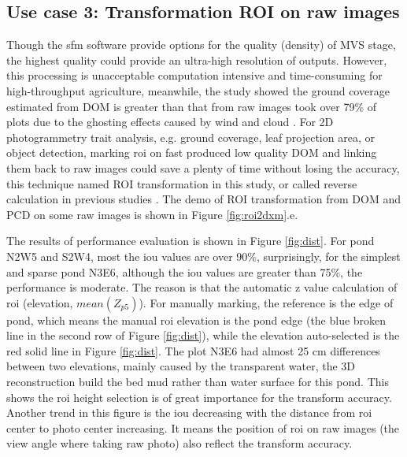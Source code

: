 \documentclass{configs/bmcart}
\begin{document}
\subsection*{Use case 3: Transformation ROI on raw images}
Though the \acrshort*{sfm} software provide options for the quality (density) of MVS stage, the highest quality could provide an ultra-high resolution of outputs. However, this processing is unacceptable computation intensive and time-consuming for high-throughput agriculture, meanwhile, the study showed the ground coverage estimated from DOM is greater than that from raw images took over 79\% of plots due to the ghosting effects caused by wind and cloud \cite{duan_comparison_2017}. For 2D photogrammetry trait analysis, e.g. ground coverage, leaf projection area, or object detection, marking \acrfull*{roi} on fast produced low quality DOM and linking them back to raw images could save a plenty of time without losing the accuracy, this technique named ROI transformation in this study, or called reverse calculation in previous studies \cite{duan_comparison_2017,tresch_easympe_2019}. The demo of ROI transformation from DOM and PCD on some raw images is shown in Figure \ref{fig:roi2dxm}.e.

The results of performance evaluation is shown in Figure \ref{fig:dist}. For pond N2W5 and S2W4, most the \acrshort*{iou} values are over 90\%, surprisingly, for the simplest and sparse pond N3E6, although the \acrshort{iou} values are greater than 75\%, the performance is moderate. The reason is that the automatic z value calculation of \acrshort*{roi} (elevation, $mean(Z_{p5})$). For manually marking, the reference is the edge of pond, which means the manual \acrshort*{roi} elevation is the pond edge (the blue broken line in the second row of Figure \ref{fig:dist}), while the elevation auto-selected is the red solid line in Figure \ref{fig:dist}. The plot N3E6 had almost 25 cm differences between two elevations, mainly caused by the transparent water, the 3D reconstruction build the bed mud rather than water surface for this pond. This shows the \acrshort*{roi} height selection is of great importance for the transform accuracy. Another trend in this figure is the \acrshort*{iou} decreasing with the distance from \acrshort*{roi} center to photo center increasing. It means the position of \acrshort*{roi} on raw images (the view angle where taking raw photo) also reflect the transform accuracy. 
\end{document}
